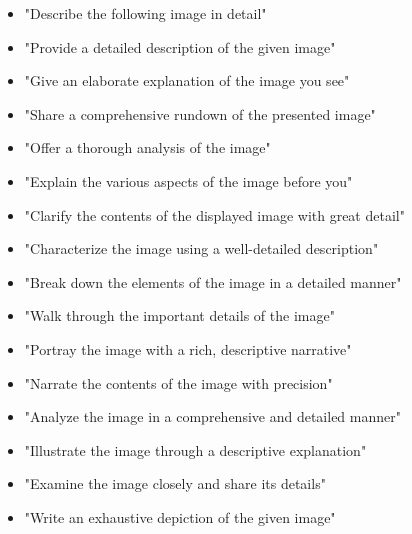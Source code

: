 \begin{table}[h!]\centering

\begin{minipage}{0.99\columnwidth}\vspace{0mm}    \centering
\begin{tcolorbox} 
    \centering
    \small
     \hspace{-6mm}
\begin{itemize}[leftmargin=7.5mm]
\setlength{\itemsep}{2pt}
    \item "Describe the following image in detail"
    \item "Provide a detailed description of the given image"
    \item "Give an elaborate explanation of the image you see"
    \item "Share a comprehensive rundown of the presented image"
    \item "Offer a thorough analysis of the image"
    \item "Explain the various aspects of the image before you"
    \item "Clarify the contents of the displayed image with great detail"
    \item "Characterize the image using a well-detailed description"
    \item "Break down the elements of the image in a detailed manner"
    \item "Walk through the important details of the image"
    \item "Portray the image with a rich, descriptive narrative"
    \item "Narrate the contents of the image with precision"
    \item "Analyze the image in a comprehensive and detailed manner"
    \item "Illustrate the image through a descriptive explanation"
    \item "Examine the image closely and share its details"
    \item "Write an exhaustive depiction of the given image"
\end{itemize}

\end{tcolorbox}
    
\vspace{-2mm}
\caption{The list of instructions for detailed image description.}
    \label{tab:detailed_describe_instructions}
\end{minipage}
\end{table}




